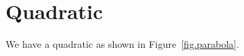 \section{Quadratic}
\label{sec.quadratic}
\lipsum[5-6] %

We have a quadratic as shown in Figure~\ref{fig.parabola}.


